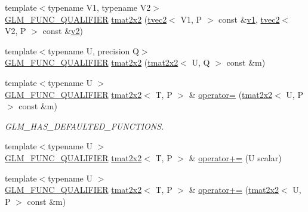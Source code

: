 \begin{DoxyCompactItemize}
\item 
{\footnotesize template$<$typename V1, typename V2$>$ }\\\mbox{\hyperlink{setup_8hpp_a33fdea6f91c5f834105f7415e2a64407}{G\+L\+M\+\_\+\+F\+U\+N\+C\+\_\+\+Q\+U\+A\+L\+I\+F\+I\+ER}} \mbox{\hyperlink{structglm_1_1tmat2x2_a62395ad6e9a11a42689e7cc9ee3b6302}{tmat2x2}} (\mbox{\hyperlink{structglm_1_1tvec2}{tvec2}}$<$ V1, P $>$ const \&\mbox{\hyperlink{glad_8h_a0779c3b73f9aa3a0ac5b0139b5d291d9}{v1}}, \mbox{\hyperlink{structglm_1_1tvec2}{tvec2}}$<$ V2, P $>$ const \&\mbox{\hyperlink{glad_8h_a9a09a1837922b2b806f4589096a52049}{v2}})
\item 
{\footnotesize template$<$typename U, precision Q$>$ }\\\mbox{\hyperlink{setup_8hpp_a33fdea6f91c5f834105f7415e2a64407}{G\+L\+M\+\_\+\+F\+U\+N\+C\+\_\+\+Q\+U\+A\+L\+I\+F\+I\+ER}} \mbox{\hyperlink{structglm_1_1tmat2x2_a2441e71c7648e358d5e65f2d21ed123a}{tmat2x2}} (\mbox{\hyperlink{structglm_1_1tmat2x2}{tmat2x2}}$<$ U, Q $>$ const \&m)
\item 
{\footnotesize template$<$typename U $>$ }\\\mbox{\hyperlink{setup_8hpp_a33fdea6f91c5f834105f7415e2a64407}{G\+L\+M\+\_\+\+F\+U\+N\+C\+\_\+\+Q\+U\+A\+L\+I\+F\+I\+ER}} \mbox{\hyperlink{structglm_1_1tmat2x2}{tmat2x2}}$<$ T, P $>$ \& \mbox{\hyperlink{structglm_1_1tmat2x2_a44d29639987fd39514ae079271487363}{operator=}} (\mbox{\hyperlink{structglm_1_1tmat2x2}{tmat2x2}}$<$ U, P $>$ const \&m)
\begin{DoxyCompactList}\small\item\em G\+L\+M\+\_\+\+H\+A\+S\+\_\+\+D\+E\+F\+A\+U\+L\+T\+E\+D\+\_\+\+F\+U\+N\+C\+T\+I\+O\+NS. \end{DoxyCompactList}\item 
{\footnotesize template$<$typename U $>$ }\\\mbox{\hyperlink{setup_8hpp_a33fdea6f91c5f834105f7415e2a64407}{G\+L\+M\+\_\+\+F\+U\+N\+C\+\_\+\+Q\+U\+A\+L\+I\+F\+I\+ER}} \mbox{\hyperlink{structglm_1_1tmat2x2}{tmat2x2}}$<$ T, P $>$ \& \mbox{\hyperlink{structglm_1_1tmat2x2_ac99f3a24a6cf9a42c8df894ee7ab4845}{operator+=}} (U scalar)
\item 
{\footnotesize template$<$typename U $>$ }\\\mbox{\hyperlink{setup_8hpp_a33fdea6f91c5f834105f7415e2a64407}{G\+L\+M\+\_\+\+F\+U\+N\+C\+\_\+\+Q\+U\+A\+L\+I\+F\+I\+ER}} \mbox{\hyperlink{structglm_1_1tmat2x2}{tmat2x2}}$<$ T, P $>$ \& \mbox{\hyperlink{structglm_1_1tmat2x2_a2edb661b12cd29f51e3dee238d904408}{operator+=}} (\mbox{\hyperlink{structglm_1_1tmat2x2}{tmat2x2}}$<$ U, P $>$ const \&m)

\end{DoxyCompactItemize}
